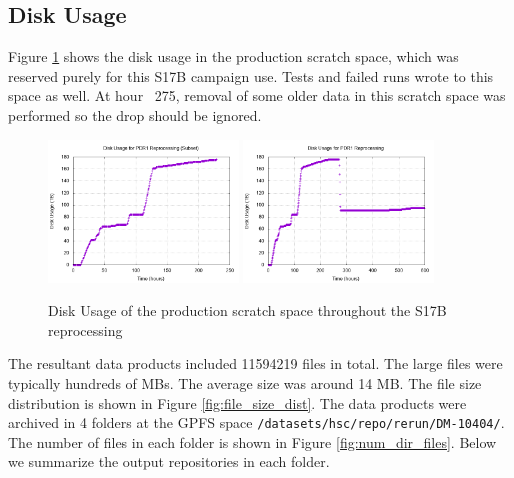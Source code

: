 \documentclass[DM,authoryear,toc]{lsstdoc}
\begin{document}
\subsection{Disk Usage}

Figure \ref{fig:df} shows the disk usage in the production scratch space, which was reserved purely for this S17B campaign use. Tests and failed runs wrote to this space as well.  At hour ~275, removal of some older data in this scratch space was performed so the drop should be ignored.
\begin{figure}[htbp]
        \begin{center}
                 \includegraphics[width=0.45\textwidth]{figures/df_focus}
                 \includegraphics[width=0.45\textwidth]{figures/df}
                 \caption{Disk Usage of the production scratch space throughout the S17B reprocessing}
                 \label{fig:df}
        \end{center}
\end{figure}

The resultant data products included 11594219 files in total.
The large files were typically hundreds of MBs.  The average size was around 14 MB. The file size distribution is shown in Figure \ref{fig:file_size_dist}.
The data products were archived in 4 folders at the GPFS space \texttt{/datasets/hsc/repo/rerun/DM-10404/}.
The number of files in each folder is shown in Figure \ref{fig:num_dir_files}.
Below we summarize the output repositories in each folder.
\end{document}
